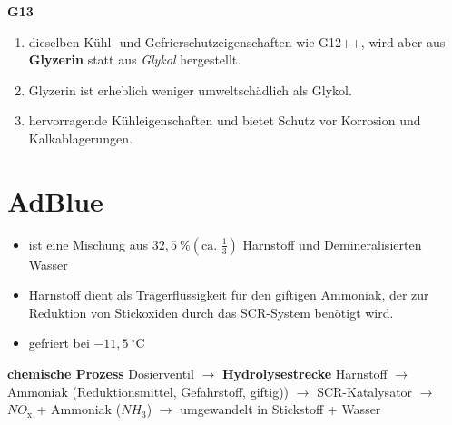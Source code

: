 \textbf{G13}

\begin{enumerate}
\item
  dieselben Kühl- und Gefrierschutzeigenschaften wie G12++, wird aber
  aus \textbf{Glyzerin} statt aus \emph{Glykol} hergestellt.
\item
  Glyzerin ist erheblich weniger umweltschädlich als Glykol.
\item
  hervorragende Kühleigenschaften und bietet Schutz vor Korrosion und
  Kalkablagerungen.
\end{enumerate}

\section{AdBlue}\label{adblue}

\begin{itemize}
\item
  ist eine Mischung aus $32,5~\% (\text{ca. } \frac{1}{3})$ Harnstoff
  und Demineralisierten Wasser
\item
  Harnstoff dient als Trägerflüssigkeit für den giftigen Ammoniak, der
  zur Reduktion von Stickoxiden durch das SCR-System benötigt wird.
\item
  gefriert bei $- 11,5~^\circ\text{C}$
\end{itemize}

\textbf{chemische Prozess} Dosierventil $\to$
\textbf{Hydrolysestrecke} Harnstoff $\to$ Ammoniak (Reduktionsmittel,
Gefahrstoff, giftig)) $\to$ SCR-Katalysator $\to$ $NO_\text{x}$ +
Ammoniak ($NH_\text{3}$) $\to$ umgewandelt in Stickstoff + Wasser

